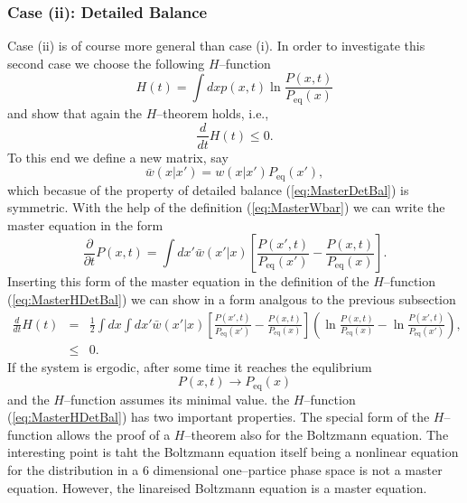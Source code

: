 \subsubsection{Case (ii): Detailed Balance}
Case (ii) is of course more general than case (i). In order to
investigate this second case we choose the following $H$--function
\begin{equation}
\label{eq:MasterHDetBal}
  H(t) = \int dx p(x,t) \ln \frac{P(x,t)}{P_{\textrm{eq}}(x)}
\end{equation}
and show that again the $H$--theorem holds, i.e.,
\begin{displaymath}
  \frac{d}{dt} H(t) \le 0.
\end{displaymath}
To this end we define a new matrix, say
\begin{equation}
\label{eq:MasterWbar}
  \bar{w}(x|x') = w(x|x') P_{\textrm{eq}}(x'),
\end{equation}
which becasue of the property of detailed balance (\ref{eq:MasterDetBal}) 
is symmetric.  With the help of the definition (\ref{eq:MasterWbar}) we can
write the master equation in the form 
\begin{displaymath}
  \frac{\partial}{\partial t} P(x,t) = \int dx'  \bar{w}(x'|x)
   \left[ \frac{P(x',t)}{P_{\textrm{eq}}(x')} -
          \frac{P(x,t)}{P_{\textrm{eq}}(x)}         \right].
\end{displaymath}
Inserting this form of the master equation in the definition of the
$H$--function (\ref{eq:MasterHDetBal}) we can show in a form analgous to the
previous subsection
\begin{eqnarray*}
  \frac{d}{dt} H(t) & = & \frac{1}{2} \int dx \int dx' 
                   \bar{w}(x'|x) \left[ \frac{P(x',t)}{P_{\textrm{eq}}(x')} -
          \frac{P(x,t)}{P_{\textrm{eq}}(x)}         \right]
            \left( \ln \frac{P(x,t)}{P_{\textrm{eq}}(x)} 
               - \ln \frac{P(x',t)}{P_{\textrm{eq}}(x')}  \right), \\
    & \le & 0.
\end{eqnarray*}
If the system is ergodic, after some time it reaches the equlibrium
\begin{displaymath}
  P(x,t) \longrightarrow P_{\textrm{eq}}(x) 
\end{displaymath}
and the $H$--function assumes its minimal value. the $H$--function 
(\ref{eq:MasterHDetBal}) has two important properties. 
The special form of
the $H$--function allows the proof of a $H$--theorem also for the Boltzmann
equation. The interesting point is taht the Boltzmann equation itself being a
nonlinear equation for the distribution in a 6 dimensional one--partice
phase space is not a master equation. However, the linareised Boltzmann
equation is a master equation.

